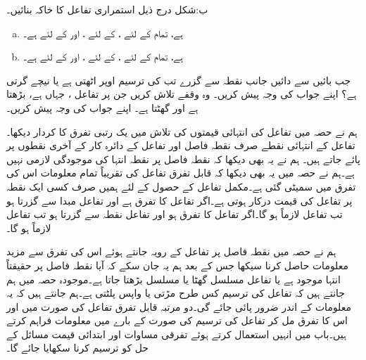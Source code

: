 ب:\quad شکل 
درج ذیل استمراری تفاعل  کا خاکہ بنائیں۔
\begin{enumerate}[a.]
\item
{} ہے، تمام  کے لئے ،  کے لئے ، اور  کے لئے  ہے۔
\item
{} ہے، تمام  کے لئے ،  کے لئے ، اور  کے لئے  ہے۔ 
\end{enumerate}
جب  بائیں سے دائیں جانب نقطہ  سے گزرے تب  کی ترسیم اوپر اٹھتی ہے یا نیچے گرتی ہے؟ اپنے جواب کی وجہ پیش کریں۔
وہ وقفے تلاش کریں جن پر تفاعل ، جہاں  ہے، بڑھتا ہے اور گھٹتا ہے۔ اپنے جواب کی وجہ پیش کریں۔


ہم نے حصہ  میں تفاعل کی انتہائی قیمتوں کی تلاش میں یک رتبی تفرق کا کردار دیکھا۔ تفاعل کے انتہائی نقطے صرف نقطہ فاصل اور تفاعل  کے دائرہ کار کے آخری نقطوں  پر پائے جاتے ہیں۔ ہم نے یہ بھی دیکھا کہ نقطہ فاصل پر نقطہ انتہا کی موجودگی لازمی نہیں ہے۔ہم نے حصہ  میں یہ بھی دیکھا کہ قابل تفرق تفاعل کی تقریباً تمام معلومات اس کی تفرق میں سمیٹی گئی ہے۔مکمل تفاعل کے حصول کے لئے  ہمیں صرف کسی ایک نقطہ پر تفاعل کی قیمت درکار ہوتی ہے۔اگر تفاعل کا تفرق  ہے اور تفاعل مبدا سے گزرتا ہو تب تفاعل لازماً  ہو گا۔اگر تفاعل کا تفرق  ہو اور تفاعل نقطہ  سے گزرتا ہو تب تفاعل لازماً   ہو گا۔

ہم نے حصہ  میں نقطہ فاصل پر تفاعل کے رویہ جانتے ہوئے اس کی تفرق سے مزید معلومات حاصل کرنا سیکھا جس کے بعد ہم یہ جان سکے کہ آیا نقطہ فاصل پر حقیقتاً انتہا موجود ہے یا تفاعل مسلسل گھٹا یا مسلسل بڑھتا جاتا ہے۔موجودہ حصہ میں ہم جانتے  ہیں کہ تفاعل  کی ترسیم  کس طرح مڑتی یا واپس پلٹتی ہے۔ہم جانتے ہیں کہ یہ معلومات  کے اندر ضرور  پائی جائے گی۔دو مرتبہ قابل تفرق تفاعل کی صورت میں   اور اس کا تفرق  مل کر تفاعل کی ترسیم کی صورت کے بارے میں معلومات فراہم کرتے ہیں۔باب  میں  انہیں استعمال کرتے ہوئے تفرقی مساوات اور ابتدائی قیمت مسائل کے حل کو ترسیم کرنا سکھایا جائے گا۔


